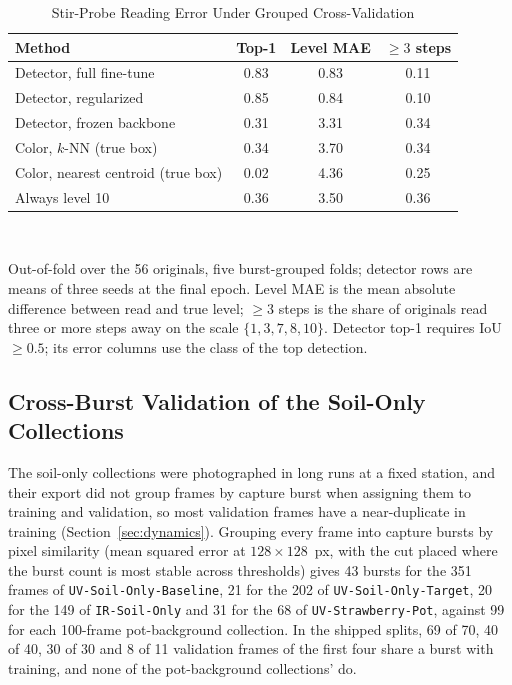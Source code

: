 ﻿\documentclass[journal]{IEEEtran}
\begin{document}
\begin{table}[!t]
\renewcommand{\arraystretch}{1.3}
\caption{Stir-Probe Reading Error Under Grouped Cross-Validation}
\label{tab:stirread}
\centering
\footnotesize
\setlength{\tabcolsep}{3.5pt}
\begin{tabular}{l c c c}
\toprule
\textbf{Method} & \textbf{Top-1} & \textbf{Level MAE} & \textbf{$\geq 3$ steps} \\
\midrule
Detector, full fine-tune & 0.83 & 0.83 & 0.11 \\
Detector, regularized & 0.85 & 0.84 & 0.10 \\
Detector, frozen backbone & 0.31 & 3.31 & 0.34 \\
Color, $k$-NN (true box) & 0.34 & 3.70 & 0.34 \\
Color, nearest centroid (true box) & 0.02 & 4.36 & 0.25 \\
Always level 10 & 0.36 & 3.50 & 0.36 \\
\bottomrule
\end{tabular}
\\[2pt]
\parbox{\columnwidth}{\footnotesize Out-of-fold over the 56 originals, five burst-grouped folds; detector rows are means of three seeds at the final epoch. Level MAE is the mean absolute difference between read and true level; $\geq 3$ steps is the share of originals read three or more steps away on the scale $\{1, 3, 7, 8, 10\}$. Detector top-1 requires IoU~$\geq 0.5$; its error columns use the class of the top detection.}
\end{table}

\subsection{Cross-Burst Validation of the Soil-Only Collections}
\label{sec:burst-cv}
The soil-only collections were photographed in long runs at a fixed station, and their export did not group frames by capture burst when assigning them to training and validation, so most validation frames have a near-duplicate in training (Section~\ref{sec:dynamics}). Grouping every frame into capture bursts by pixel similarity (mean squared error at $128 \times 128$~px, with the cut placed where the burst count is most stable across thresholds) gives 43 bursts for the 351 frames of \texttt{UV-Soil-Only-Baseline}, 21 for the 202 of \texttt{UV-Soil-Only-Target}, 20 for the 149 of \texttt{IR-Soil-Only} and 31 for the 68 of \texttt{UV-Strawberry-Pot}, against 99 for each 100-frame pot-background collection. In the shipped splits, 69 of 70, 40 of 40, 30 of 30 and 8 of 11 validation frames of the first four share a burst with training, and none of the pot-background collections' do.
\end{document}
